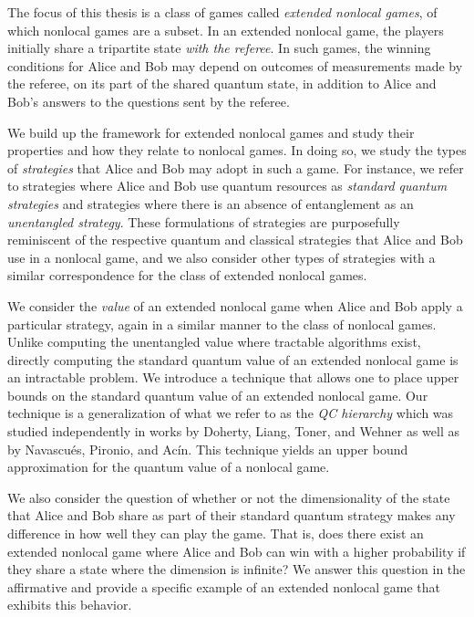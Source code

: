 The focus of this thesis is a class of games called \emph{extended nonlocal games}, of which nonlocal games are a subset. In an extended nonlocal game, the players initially share a tripartite state \emph{with the referee}. In such games, the winning conditions for Alice and Bob may depend on outcomes of measurements made by the referee, on its part of the shared quantum state, in addition to Alice and Bob's answers to the questions sent by the referee. 

We build up the framework for extended nonlocal games and study their properties and how they relate to nonlocal games. In doing so, we study the types of \emph{strategies} that Alice and Bob may adopt in such a game. For instance, we refer to strategies where Alice and Bob use quantum resources as \emph{standard quantum strategies} and strategies where there is an absence of entanglement as an \emph{unentangled strategy}. These formulations of strategies are purposefully reminiscent of the respective quantum and classical strategies that Alice and Bob use in a nonlocal game, and we also consider other types of strategies with a similar correspondence for the class of extended nonlocal games. 

We consider the \emph{value} of an extended nonlocal game when Alice and Bob apply a particular strategy, again in a similar manner to the class of nonlocal games. Unlike computing the unentangled value where tractable algorithms exist, directly computing the standard quantum value of an extended nonlocal game is an intractable problem. We introduce a technique that allows one to place upper bounds on the standard quantum value of an extended nonlocal game. Our technique is a generalization of what we refer to as the \emph{QC hierarchy} which was studied independently in works by Doherty, Liang, Toner, and Wehner as well as by Navascu\'{e}s, Pironio, and Ac\'{i}n. This technique yields an upper bound approximation for the quantum value of a nonlocal game.

We also consider the question of whether or not the dimensionality of the state that Alice and Bob share as part of their standard quantum strategy makes any difference in how well they can play the game. That is, does there exist an extended nonlocal game where Alice and Bob can win with a higher probability if they share a state where the dimension is infinite? We answer this question in the affirmative and provide a specific example of an extended nonlocal game that exhibits this behavior.   


